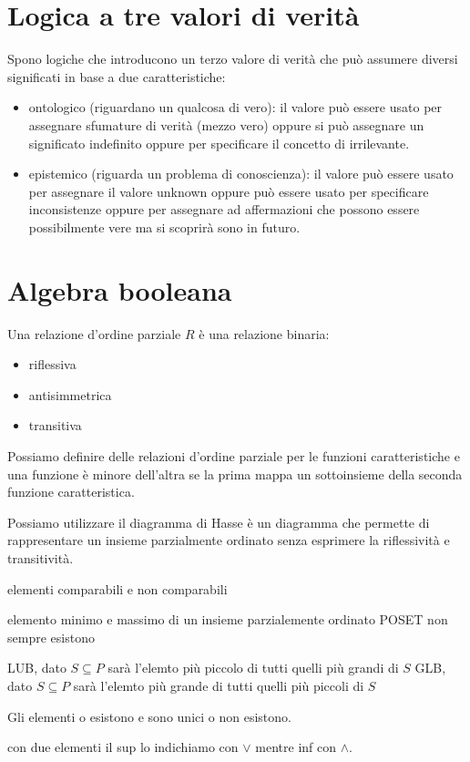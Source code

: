 \section{Logica a tre valori di verità}
Spono logiche che introducono un terzo valore di verità che può assumere diversi 
significati in base a due caratteristiche:
\begin{itemize}
    \item ontologico (riguardano un qualcosa di vero): il valore può essere usato per assegnare sfumature di verità (mezzo vero)
    oppure si può assegnare un significato indefinito oppure per specificare il 
    concetto di irrilevante.
    \item epistemico (riguarda un problema di conoscienza): il valore può essere 
    usato per assegnare il valore unknown oppure può essere usato per specificare 
    inconsistenze  oppure per assegnare ad affermazioni che possono essere possibilmente 
    vere ma si scoprirà sono in futuro.
\end{itemize}


\section{Algebra booleana}
\begin{definizione}
    Una relazione d'ordine parziale $R$ è una relazione binaria:
    \begin{itemize}
        \item riflessiva
        \item antisimmetrica
        \item transitiva
    \end{itemize}
\end{definizione}

\begin{esempio}
    Possiamo definire delle relazioni d'ordine parziale per le funzioni caratteristiche 
    e una funzione è minore dell'altra se la prima mappa un sottoinsieme della seconda 
    funzione caratteristica.
\end{esempio}

Possiamo utilizzare il diagramma di Hasse è un diagramma che permette di rappresentare 
un insieme parzialmente ordinato senza esprimere la riflessività e transitività.

\begin{definizione}
    elementi comparabili e non comparabili
\end{definizione}
\begin{definizione}
    elemento minimo e massimo di un insieme parzialemente ordinato POSET non sempre 
    esistono
\end{definizione}
\begin{definizione}
    LUB, dato $S\subseteq P$ sarà l'elemto più piccolo di tutti quelli più grandi di $S$
    GLB, dato $S\subseteq P$ sarà l'elemto più grande di tutti quelli più piccoli di $S$

    Gli elementi o esistono e sono unici o non esistono. 
\end{definizione}
con due elementi il sup lo indichiamo con $\lor$ mentre inf con $\land$.

